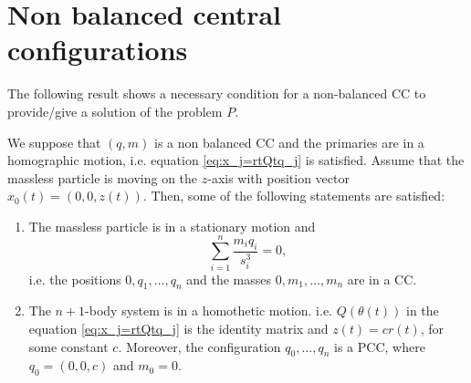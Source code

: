 \documentclass[smallcondensed]{svjour3}
\begin{document}
\section{Non balanced central configurations}

The following result shows a necessary condition for a non-balanced CC to \textcolor[rgb]{1,0,0}{provide/give } a solution of the problem $P$.

\begin{theorem}\label{thm:no.admisible.movimiento}
We suppose that $(q,m)$ is a non balanced CC and the primaries are in a homographic motion, i.e.  equation \eqref{eq:x_j=rtQtq_j} is satisfied. Assume that the massless particle is moving on the $z$-axis with position vector $x_0(t)=(0,0,z(t))$. Then, some of the following statements are satisfied:
\begin{enumerate}
 \item\label{it:z==0} The massless particle is in a stationary motion and
 \begin{equation}\label{eq:acel.centrmasa=0}
  \sum_{i=1}^{n}\frac{m_iq_i}{s_i^3}=0,
 \end{equation}
 i.e. the positions $0,q_1,\ldots,q_n$ and the masses $0,m_1,\ldots,m_n$ are in a CC.
 \item\label{it:z=r} The $n+1$-body system is in a homothetic motion. i.e. $Q(\theta(t))$ in the equation \eqref{eq:x_j=rtQtq_j} is the identity matrix and $z(t)=cr(t)$, for some constant $c$. Moreover, the configuration $q_0,\ldots,q_n$ is a PCC, where $q_0=(0,0,c)$ and $m_0=0$.
\end{enumerate}
\end{theorem}
\end{document}
